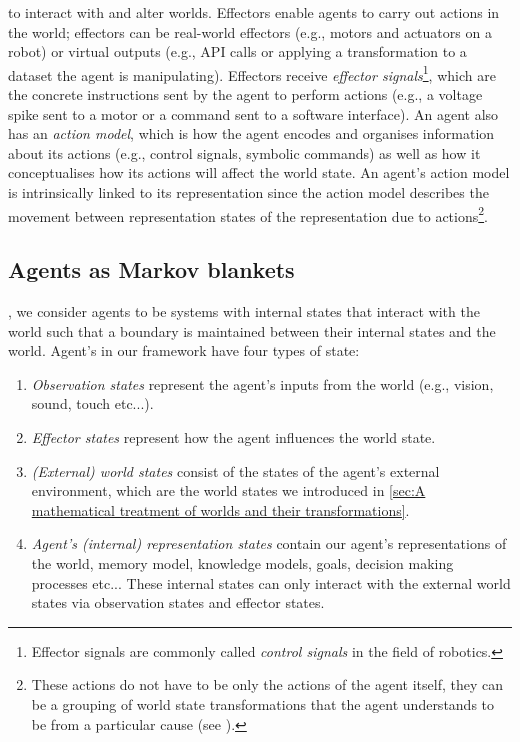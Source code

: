  to interact with and alter worlds.
Effectors enable agents to carry out actions in the world; effectors can be real-world effectors (e.g., motors and actuators on a robot) or virtual outputs (e.g., API calls or applying a transformation to a dataset the agent is manipulating).
Effectors receive \emph{effector signals}\footnote{
Effector signals are commonly called \emph{control signals} in the field of robotics.
}, which are the concrete instructions sent by the agent to perform actions (e.g., a voltage spike sent to a motor or a command sent to a software interface).
An agent also has an \emph{action model}, which is how the agent encodes and organises information about its actions (e.g., control signals, symbolic commands) as well as how it conceptualises how its actions will affect the world state.
An agent's action model is intrinsically linked to its representation since the action model describes the movement between representation states of the representation due to actions\footnote{
These actions do not have to be only the actions of the agent itself, they can be a grouping of world state transformations that the agent understands to be from a particular cause (see ).
}.

\subsection{Agents as Markov blankets}

, we consider agents to be systems with internal states that interact with the world such that a boundary is maintained between their internal states and the world.
Agent's in our framework have four types of state:
\begin{enumerate}
	\item \emph{Observation states} represent the agent's inputs from the world (e.g., vision, sound, touch etc...).
	\item \emph{Effector states} represent how the agent influences the world state.
	\item \emph{(External) world states} consist of the states of the agent's external environment, which are the world states we introduced in \cref{sec:A mathematical treatment of worlds and their transformations}.
	\item \emph{Agent's (internal) representation states} contain our agent's representations of the world, memory model, knowledge models, goals, decision making processes etc...
	      These internal states can only interact with the external world states via observation states and effector states.
\end{enumerate}

